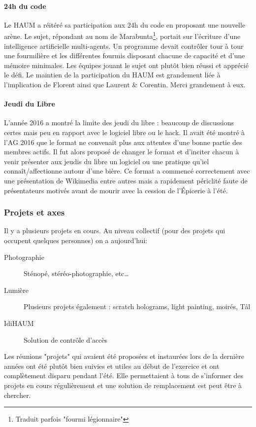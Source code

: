\documentclass[11pt]{article}
\begin{document}
\paragraph{24h du code} Le HAUM a réitéré sa participation aux 24h du code en proposant
une nouvelle arène. Le sujet, répondant au nom de Marabunta\footnote{Traduit parfois
"fourmi légionnaire"}, portait sur l'écriture d'une intelligence artificielle
multi-agents. Un programme devait contrôler tour à tour une fourmilière et les différentes
fourmis disposant chacune de capacité et d'une mémoire minimales. Les équipes jouant le
sujet ont plutôt bien réussi et apprécié le défi. Le maintien de la participation du HAUM
est grandement liée à l'implication de Florent ainsi que Laurent \& Corentin. Merci
grandement à eux.

\paragraph{Jeudi du Libre} L'année 2016 a montré la limite des jeudi du libre : beaucoup
de discussions certes mais peu en rapport avec le logiciel libre ou le hack. Il avait été
montré à l'AG 2016 que le format ne convenait plus aux attentes d'une bonne partie des
membres actifs. Il fut alors proposé de changer le format et d'inciter chacun à venir
présenter aux jeudis du libre un logiciel ou une pratique qu'iel connaît/affectionne
autour d'une bière. Ce format a commencé correctement avec une présentation de Wikimedia
entre autres mais a rapidement périclité faute de présentateurs motivés avant de mourir
avec la cession de l'Épicerie à l'été.

\subsubsection{Projets et axes}

Il y a plusieurs projets en cours. Au niveau collectif (pour des projets qui occupent
quelques personnes) on a aujourd'hui:

\begin{description}
	\item[Photographie] Sténopé, stéréo-photographie, etc\ldots
	\item[Lumière] Plusieurs projets également : scratch holograms, light painting,  moirés, Tål
	\item[IdiHAUM] Solution de contrôle d'accès
\end{description}

Les réunions "projets" qui avaient été proposées et instaurées lors de la dernière années
ont été plutôt bien suivies et utiles au début de l'exercice et ont complètement disparu
pendant l'été. Elle permettaient à tous de s'informer des projets en cours régulièrement
et une solution de remplacement est peut être à chercher.
\end{document}
